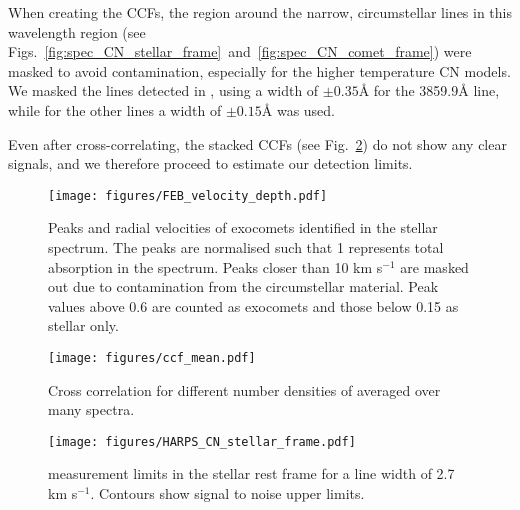 \documentclass{aa}
\newcommand{\kms}{km s$^{-1}$}
\begin{document}
When creating the CCFs, the region around the narrow, circumstellar  lines in this wavelength region (see Figs.~\ref{fig:spec_CN_stellar_frame}~and~\ref{fig:spec_CN_comet_frame}) were masked to avoid contamination, especially for the higher temperature CN models.
%
We masked the lines detected in \citep{Kiefer2018}, using a width of $\pm0.35$\AA{} for the  3859.9\AA{} line, while for the other lines a width of $\pm0.15$\AA{} was used.

Even after cross-correlating, the stacked CCFs (see Fig.~\ref{fig:ccf_mean}) do not show any clear signals, and we therefore proceed to estimate our detection limits.

\begin{figure}
    \begin{centering}
        \texttt{[image: figures/FEB\_velocity\_depth.pdf]}
        \caption{Peaks and radial velocities of exocomets identified in the stellar spectrum.
        The peaks are normalised such that 1 represents total absorption in the spectrum.
        Peaks closer than 10 \kms{} are masked out due to contamination from the circumstellar material.
        Peak values above 0.6 are counted as exocomets and those below 0.15 as stellar only.}
        \label{fig:FEB_velocity}
    \end{centering}
\end{figure}

\begin{figure}
    \begin{centering}
        \texttt{[image: figures/ccf\_mean.pdf]}
        \caption{Cross correlation for different number densities of  averaged over many spectra.}
        \label{fig:ccf_mean}
    \end{centering}
\end{figure}

\begin{figure}
    \begin{centering}
        \texttt{[image: figures/HARPS\_CN\_stellar\_frame.pdf]}
        \caption{ measurement limits in the stellar rest frame for a  line width of 2.7 \kms{}. Contours show signal to noise upper limits.}
        \label{fig:CN_stellar_frame}
    \end{centering}
\end{figure}
\end{document}
